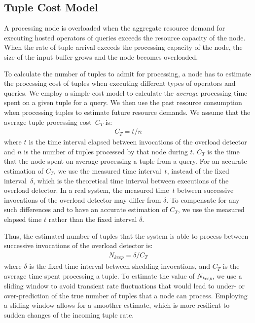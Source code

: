 \subsection*{Tuple Cost Model}
\label{sec:arch-cost_model}

A processing node is overloaded when the aggregate resource demand for executing hosted operators of
queries exceeds the resource capacity of the node. 
When the rate of tuple arrival exceeds the processing capacity of the node, the size of the input buffer
grows and the node becomes overloaded.

To calculate the number of tuples to admit for processing, a node has to estimate the processing cost of
tuples when executing different types of operators and queries. We employ a simple cost model to
calculate the \emph{average} processing time spent on a given tuple for a query. We then use the past
resource consumption when processing tuples to estimate future resource demands.
We assume that the average tuple processing cost~$C_T$ is:
\begin{align}
C_T = t / n
\end{align} 
where $t$ is the time interval elapsed between invocations of the overload detector and $n$ is the
number of tuples processed by that node during $t$. $C_T$ is the time that the node spent on average
processing a tuple from a query.
For an accurate estimation of $C_T$, we use the measured time interval~$t$,
instead of the fixed interval~$\delta$, which is the theoretical time interval between executions of the 
overload detector.
In a real system, the measured time~$t$ between successive invocations of the overload detector
may differ from $\delta$. To compensate for any such differences and to have an accurate
estimation of $C_T$, we use the measured elapsed time $t$ rather than the fixed
interval $\delta$. 

Thus, the estimated number of tuples that the system is able to process between successive invocations
of the overload detector is:
\begin{align}
N_{keep} = \delta / C_T
\end{align} 
where $\delta$ is the fixed time interval between shedding invocations, and $C_T$ is the average time
spent processing a tuple.
To estimate the value of $N_{keep}$, we use a sliding window to avoid transient rate
fluctuations that would lead to under- or over-prediction of the true number of tuples that a node can
process. Employing a sliding window allows for a smoother estimate, which is more resilient to sudden
changes of the incoming tuple rate.

